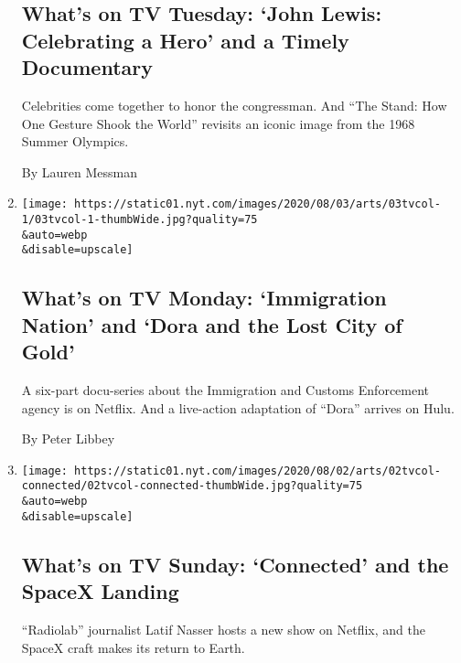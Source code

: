 \begin{enumerate}
  \hypertarget{whats-on-tv-tuesday-john-lewis-celebrating-a-hero-and-a-timely-documentary}{%
  \subsection{What's on TV Tuesday: `John Lewis: Celebrating a Hero' and
  a Timely
  Documentary}\label{whats-on-tv-tuesday-john-lewis-celebrating-a-hero-and-a-timely-documentary}}

  Celebrities come together to honor the congressman. And ``The Stand:
  How One Gesture Shook the World'' revisits an iconic image from the
  1968 Summer Olympics.

  By Lauren Messman
\item
  \href{/2020/08/03/arts/television/whats-on-tv-monday-immigration-nation-and-dora-and-the-lost-city-of-gold.html}{}

  \texttt{[image: https://static01.nyt.com/images/2020/08/03/arts/03tvcol-1/03tvcol-1-thumbWide.jpg?quality=75\\\&auto=webp\\\&disable=upscale]}

  \hypertarget{whats-on-tv-monday-immigration-nation-and-dora-and-the-lost-city-of-gold}{%
  \subsection{What's on TV Monday: `Immigration Nation' and `Dora and
  the Lost City of
  Gold'}\label{whats-on-tv-monday-immigration-nation-and-dora-and-the-lost-city-of-gold}}

  A six-part docu-series about the Immigration and Customs Enforcement
  agency is on Netflix. And a live-action adaptation of ``Dora'' arrives
  on Hulu.

  By Peter Libbey
\item
  \href{/2020/08/02/arts/television/whats-on-tv-sunday-connected-and-the-spacex-landing.html}{}

  \texttt{[image: https://static01.nyt.com/images/2020/08/02/arts/02tvcol-connected/02tvcol-connected-thumbWide.jpg?quality=75\\\&auto=webp\\\&disable=upscale]}

  \hypertarget{whats-on-tv-sunday-connected-and-the-spacex-landing}{%
  \subsection{What's on TV Sunday: `Connected' and the SpaceX
  Landing}\label{whats-on-tv-sunday-connected-and-the-spacex-landing}}

  ``Radiolab'' journalist Latif Nasser hosts a new show on Netflix, and
  the SpaceX craft makes its return to Earth.


\end{enumerate}
